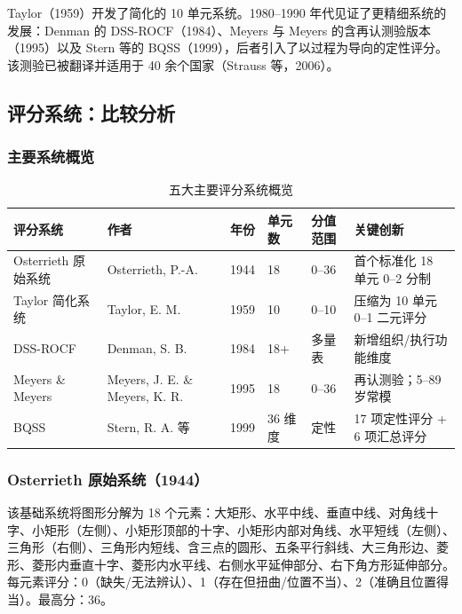\documentclass[12pt,a4paper]{ctexart}
\newcommand{\tablefontsize}{\small}
\begin{document}
Taylor（1959）开发了简化的 10 单元系统。1980–1990 年代见证了更精细系统的发展：Denman 的 DSS-ROCF（1984）、Meyers 与 Meyers 的含再认测验版本（1995）以及 Stern 等的 BQSS（1999），后者引入了以过程为导向的定性评分。该测验已被翻译并适用于 40 余个国家（Strauss 等，2006）。

\subsection{评分系统：比较分析}

\subsubsection{主要系统概览}

\begin{table}[h!]
\centering
\tablefontsize
\caption{五大主要评分系统概览}
\begin{tabular}{p{2.2cm}p{2.2cm}p{1cm}p{1.2cm}p{1.2cm}p{5.8cm}}
\toprule
\textbf{评分系统} & \textbf{作者} & \textbf{年份} & \textbf{单元数} & \textbf{分值范围} & \textbf{关键创新} \\
\midrule
Osterrieth 原始系统 & Osterrieth, P.-A. & 1944 & 18 & 0–36 & 首个标准化 18 单元 0–2 分制 \\
Taylor 简化系统 & Taylor, E. M. & 1959 & 10 & 0–10 & 压缩为 10 单元 0–1 二元评分 \\
DSS-ROCF & Denman, S. B. & 1984 & 18+ & 多量表 & 新增组织/执行功能维度 \\
Meyers \& Meyers & Meyers, J. E. \& Meyers, K. R. & 1995 & 18 & 0–36 & 再认测验；5–89 岁常模 \\
BQSS & Stern, R. A. 等 & 1999 & 36 维度 & 定性 & 17 项定性评分 + 6 项汇总评分 \\
\bottomrule
\end{tabular}
\end{table}

\subsubsection{Osterrieth 原始系统（1944）}

该基础系统将图形分解为 18 个元素：大矩形、水平中线、垂直中线、对角线十字、小矩形（左侧）、小矩形顶部的十字、小矩形内部对角线、水平短线（左侧）、三角形（右侧）、三角形内短线、含三点的圆形、五条平行斜线、大三角形边、菱形、菱形内垂直十字、菱形内水平线、右侧水平延伸部分、右下角方形延伸部分。每元素评分：0（缺失/无法辨认）、1（存在但扭曲/位置不当）、2（准确且位置得当）。最高分：36。
\end{document}
